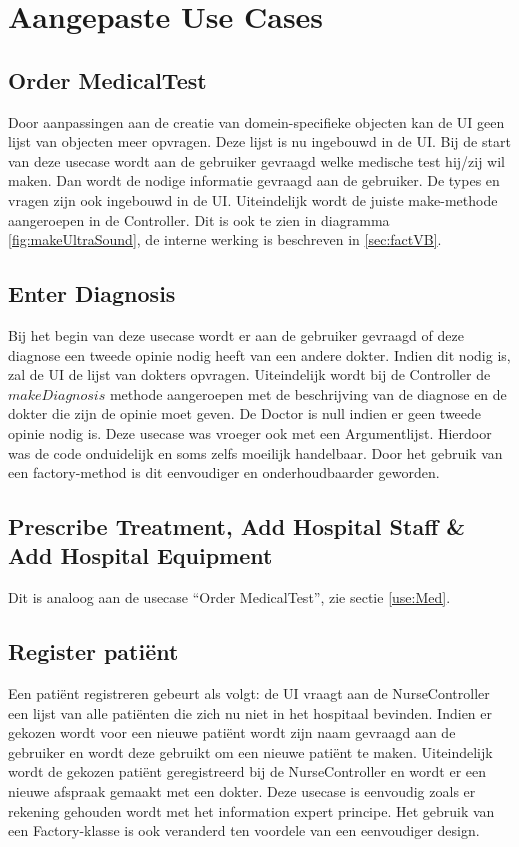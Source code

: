 \section{Aangepaste Use Cases\label{Volledig}}

\subsection{Order MedicalTest\label{use:Med}}
Door aanpassingen aan de creatie van domein-specifieke objecten kan de UI geen lijst van objecten meer opvragen. 
Deze lijst is nu ingebouwd in de UI. 
Bij de start van deze usecase wordt aan de gebruiker gevraagd welke medische test hij/zij wil maken. 
Dan wordt de nodige informatie gevraagd aan de gebruiker. De types en vragen zijn ook ingebouwd in de UI.
Uiteindelijk wordt de juiste make-methode aangeroepen in de Controller. 
Dit is ook te zien in diagramma \ref{fig:makeUltraSound}, de interne werking is beschreven in \ref{sec:factVB}.

\subsection{Enter Diagnosis}
Bij het begin van deze usecase wordt er aan de gebruiker gevraagd of deze diagnose een tweede opinie nodig heeft van een andere dokter.
Indien dit nodig is, zal de UI de lijst van dokters opvragen. 
Uiteindelijk wordt bij de Controller de $makeDiagnosis$ methode aangeroepen met de beschrijving van de diagnose en de dokter die zijn de opinie moet geven.
De Doctor is null indien er geen tweede opinie nodig is.
Deze usecase was vroeger ook met een Argumentlijst. Hierdoor was de code onduidelijk en soms zelfs moeilijk handelbaar. 
Door het gebruik van een factory-method is dit eenvoudiger en onderhoudbaarder geworden.

\subsection{Prescribe Treatment, Add Hospital Staff \& Add Hospital Equipment}
Dit is analoog aan de usecase ``Order MedicalTest'', zie sectie \ref{use:Med}. 

\subsection{Register patiënt}
Een patiënt registreren gebeurt als volgt: de UI vraagt aan de NurseController een lijst van alle patiënten die zich nu niet in het hospitaal bevinden.
Indien er gekozen wordt voor een nieuwe patiënt wordt zijn naam gevraagd aan de gebruiker en wordt deze gebruikt om een nieuwe patiënt te maken. 
Uiteindelijk wordt de gekozen patiënt geregistreerd bij de NurseController en wordt er een nieuwe afspraak gemaakt met een dokter.
Deze usecase is eenvoudig zoals er rekening gehouden wordt met het information expert principe. 
Het gebruik van een Factory-klasse is ook veranderd ten voordele van een eenvoudiger design.



